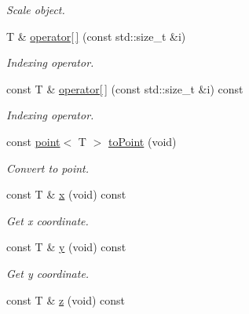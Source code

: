 \begin{DoxyCompactItemize}
\begin{DoxyCompactList}\small\item\em Scale object. \end{DoxyCompactList}\item 
T \& \hyperlink{classddd_1_1vector_a38e2123649fc4ebf839f22e5061b9497}{operator\mbox{[}$\,$\mbox{]}} (const std\+::size\+\_\+t \&i)
\begin{DoxyCompactList}\small\item\em Indexing operator. \end{DoxyCompactList}\item 
const T \& \hyperlink{classddd_1_1vector_a7e8d544a596450edb30914dcc21159fc}{operator\mbox{[}$\,$\mbox{]}} (const std\+::size\+\_\+t \&i) const
\begin{DoxyCompactList}\small\item\em Indexing operator. \end{DoxyCompactList}\item 
\mbox{\label{classddd_1_1vector_a03b2e6b791ba94309e97dd9f5b37cb3f}} 
const \hyperlink{classddd_1_1point}{point}$<$ T $>$ \hyperlink{classddd_1_1vector_a03b2e6b791ba94309e97dd9f5b37cb3f}{to\+Point} (void)
\begin{DoxyCompactList}\small\item\em Convert to point. \end{DoxyCompactList}\item 
\mbox{\label{classddd_1_1vector_a1108468dc6ce04acf1d74949177c97b3}} 
const T \& \hyperlink{classddd_1_1vector_a1108468dc6ce04acf1d74949177c97b3}{x} (void) const
\begin{DoxyCompactList}\small\item\em Get x coordinate. \end{DoxyCompactList}\item 
\mbox{\label{classddd_1_1vector_a678928885fa7bcdb22f25eff71f74cdd}} 
const T \& \hyperlink{classddd_1_1vector_a678928885fa7bcdb22f25eff71f74cdd}{y} (void) const
\begin{DoxyCompactList}\small\item\em Get y coordinate. \end{DoxyCompactList}\item 
\mbox{\label{classddd_1_1vector_a6f9a297e7ba387597ca0515421012166}} 
const T \& \hyperlink{classddd_1_1vector_a6f9a297e7ba387597ca0515421012166}{z} (void) const

\end{DoxyCompactItemize}
